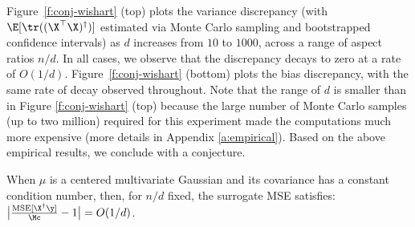 Figure~\ref{f:conj-wishart} (top) plots the variance discrepancy (with
$\E[\tr((\X^\top\X)^\dagger)]$ estimated via Monte Carlo
sampling and bootstrapped confidence intervals) as $d$ increases from $10$ to
$1000$, across a range of aspect ratios $n/d$. In all cases, we observe that
the discrepancy decays to zero at a rate of $O(1/d)$.
Figure~\ref{f:conj-wishart} (bottom) plots the bias discrepancy, with the same
rate of decay observed throughout.  Note that the range of $d$ is smaller than
in Figure \ref{f:conj-wishart} (top) because the large number of Monte Carlo
samples (up to two million) required for this experiment made the computations
much more expensive (more details in Appendix \ref{a:empirical}). Based on the
above empirical results, we conclude with a conjecture.
\begin{conjecture}
  \label{c:1-over-d-rate}
  When $\mu$ is a centered multivariate Gaussian and its covariance
  has a constant condition
  number, then, for $n/d$ fixed, the surrogate MSE satisfies:
  $\big|\frac{\textnormal{MSE}[\X^\dagger\y]}{\Mc}-1\big|= O(1/d)$.
\end{conjecture}




